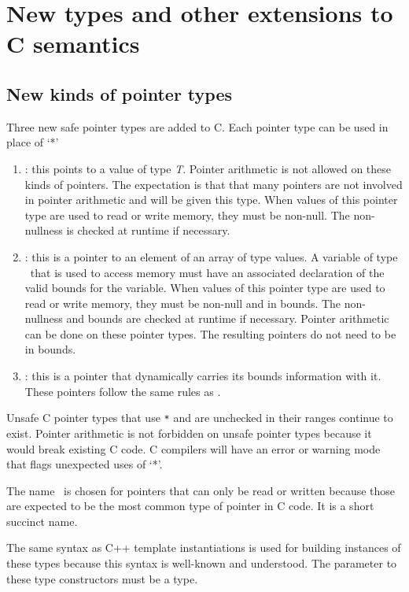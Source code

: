 
\chapter{New types and other extensions to C semantics}
\label{chapter:core-extensions}

\section{New kinds of pointer types}
Three new safe pointer types are added to C. Each pointer type can be
used in place of `*'

\begin{enumerate}
\item
  \ptrT: this points to
  a value of type \textit{T}. Pointer arithmetic is not allowed on these
  kinds of pointers. The expectation is that that many pointers are not
  involved in pointer arithmetic and will be given this type. When
  values of this pointer type are used to read or write memory, they
  must be non-null. The non-nullness is checked at runtime if necessary.
\item
  \arrayptrT: this is
  a pointer to an element of an array of type  values. A
  variable of type \arrayptr\ that is used to access memory
  must have an associated declaration of the valid bounds for the
  variable. When values of this pointer type are used to read or write
  memory, they must be non-null and in bounds. The non-nullness and
  bounds are checked at runtime if necessary. Pointer arithmetic can be
  done on these pointer types. The resulting pointers do not need to be
  in bounds.
\item
  \arrayviewT: this
  is a pointer that dynamically carries its bounds information with it.
  These pointers follow the same rules as
  \arrayptrT .
\end{enumerate}

Unsafe C pointer types that use \texttt{*} and are unchecked in their
ranges continue to exist. Pointer arithmetic is not forbidden on unsafe
pointer types because it would break existing C code. C compilers will
have an error or warning mode that flags unexpected uses of `*'.

The name \ptr\ is chosen for pointers that can only be read or
written because those are expected to be the most common type of pointer
in C code. It is a short succinct name.

The same syntax as C++ template instantiations is used for building
instances of these types because this syntax is well-known and
understood. The parameter to these type constructors must be a type.

